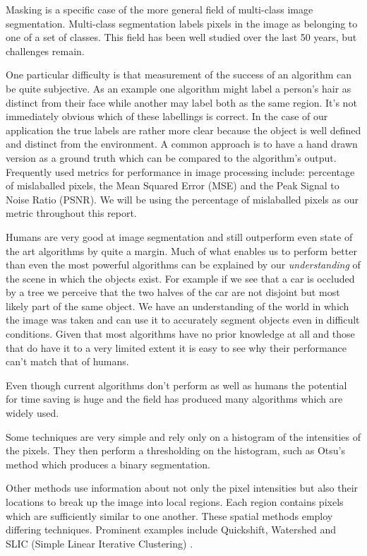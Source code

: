 \documentclass[12pt]{IIBproject}
\begin{document}
Masking is a specific case of the more general field of multi-class image segmentation\cite{pal1993review}. Multi-class segmentation labels pixels in the image as belonging to one of a set of classes. This field has been well studied over the last 50 years\cite{wang2008image}, but challenges remain. 

One particular difficulty is that measurement of the success of an algorithm can be quite subjective. As an example one algorithm might label a person's hair as distinct from their face while another may label both as the same region. It's not immediately obvious which of these labellings is correct. In the case of our application the true labels are rather more clear because the object is well defined and distinct from the environment. A common approach is to have a hand drawn version as a ground truth which can be compared to the algorithm's output. Frequently used metrics for performance in image processing include: percentage of mislaballed pixels, the Mean Squared Error (MSE) and the Peak Signal to Noise Ratio (PSNR)\cite{ponomarenko2009metrics}. We will be using the percentage of mislaballed pixels as our metric throughout this report.  

Humans are very good at image segmentation and still outperform even state of the art algorithms by quite a margin\cite{guraripull}. Much of what enables us to perform better than even the most powerful algorithms can be explained by our \emph{understanding} of the scene in which the objects exist. For example if we see that a car is occluded by a tree we perceive that the two halves of the car are not disjoint but most likely part of the same object. We have an understanding of the world in which the image was taken and can use it to accurately segment objects even in difficult conditions. Given that most algorithms have no prior knowledge at all and those that do have it to a very limited extent it is easy to see why their performance can't match that of humans.

Even though current algorithms don't perform as well as humans the potential for time saving is huge and the field has produced many algorithms which are widely used. 

Some techniques are very simple and rely only on a histogram of the intensities of the pixels. They then perform a thresholding on the histogram, such as Otsu's method\cite{otsu1975threshold} which produces a binary segmentation. 

Other methods use information about not only the pixel intensities but also their locations to break up the image into local regions. Each region contains pixels which are sufficiently similar to one another. These spatial methods employ differing techniques.  Prominent examples include Quickshift\cite{vedaldi2008quick}, Watershed\cite{vincent1991watersheds} and SLIC (Simple Linear Iterative Clustering) \cite{achanta2012slic}.
\end{document}
